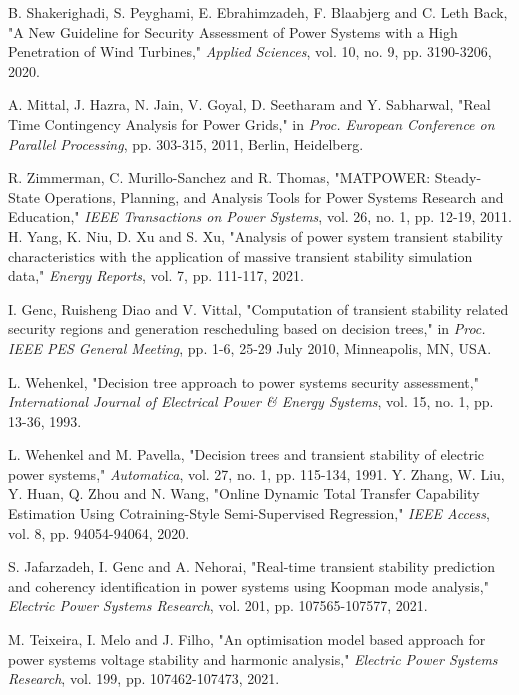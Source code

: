 \begin{thebibliography}{99}
\begin{singlespace}
 B. Shakerighadi, S. Peyghami, E. Ebrahimzadeh, F. Blaabjerg and C. Leth Back, "A New Guideline for Security Assessment of Power Systems with a High Penetration of Wind Turbines," \textit{Applied Sciences}, vol. 10, no. 9, pp. 3190-3206, 2020.

 A. Mittal, J. Hazra, N. Jain, V. Goyal, D. Seetharam and Y. Sabharwal, "Real Time Contingency Analysis for Power Grids," in \textit{Proc. European Conference on Parallel Processing}, pp. 303-315, 2011, Berlin, Heidelberg.


 R. Zimmerman, C. Murillo-Sanchez and R. Thomas, "MATPOWER: Steady-State Operations, Planning, and Analysis Tools for Power Systems Research and Education," \textit{IEEE Transactions on Power Systems}, vol. 26, no. 1, pp. 12-19, 2011.
 H. Yang, K. Niu, D. Xu and S. Xu, "Analysis of power system transient stability characteristics with the application of massive transient stability simulation data," \textit{Energy Reports}, vol. 7, pp. 111-117, 2021. 

 I. Genc, Ruisheng Diao and V. Vittal, "Computation of transient stability related security regions and generation rescheduling based on decision trees," in \textit{Proc. IEEE PES General Meeting}, pp. 1-6, 25-29 July 2010, Minneapolis, MN, USA.

 L. Wehenkel, "Decision tree approach to power systems security assessment," \textit{International Journal of Electrical Power \& Energy Systems}, vol. 15, no. 1, pp. 13-36, 1993.

 L. Wehenkel and M. Pavella, "Decision trees and transient stability of electric power systems," \textit{Automatica}, vol. 27, no. 1, pp. 115-134, 1991. 
 Y. Zhang, W. Liu, Y. Huan, Q. Zhou and N. Wang, "Online Dynamic Total Transfer Capability Estimation Using Cotraining-Style Semi-Supervised Regression," \textit{IEEE Access}, vol. 8, pp. 94054-94064, 2020.

 S. Jafarzadeh, I. Genc and A. Nehorai, "Real-time transient stability prediction and coherency identification in power systems using Koopman mode analysis," \textit{Electric Power Systems Research}, vol. 201, pp. 107565-107577, 2021.

 M. Teixeira, I. Melo and J. Filho, "An optimisation model based approach for power systems voltage stability and harmonic analysis," \textit{Electric Power Systems Research}, vol. 199, pp. 107462-107473, 2021.


\end{singlespace}
\end{thebibliography}
